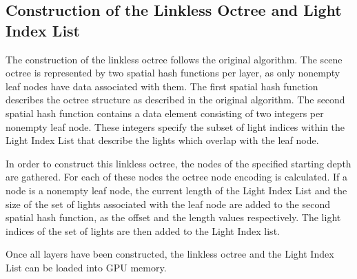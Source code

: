 

\subsection{Construction of the Linkless Octree and Light Index List}

The construction of the linkless octree follows the original algorithm. The
scene octree is represented by two spatial hash functions per layer, as only
nonempty leaf nodes have data associated with them. The first spatial hash function
describes the octree structure as described in the original algorithm. The second spatial
hash function contains a data element consisting of two integers per nonempty leaf node.
These integers specify the subset of light indices within the Light Index List that
describe the lights which overlap with the leaf node.

In order to construct this linkless octree, the nodes of the specified starting depth
are gathered. For each of these nodes the octree node encoding is calculated. If a
node is a nonempty leaf node, the current length of the Light Index List and the size of
the set of lights associated with the leaf node are added to the second spatial hash function,
as the offset and the length values respectively. The light indices of the set of lights
are then added to the Light Index list.

Once all layers have been constructed, the linkless octree and the Light Index List can
be loaded into GPU memory.



